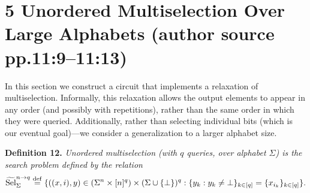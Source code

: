 \documentclass[10pt,a4paper]{article}
\newcommand{\uSel}{\widetilde{\operatorname{Sel}}}
\newenvironment{originalresult}[1]{\par\medskip\noindent\textbf{#1.}\itshape}{\par\medskip}
\begin{document}
\section*{5 Unordered Multiselection Over Large Alphabets (author source pp.11:9--11:13)}
In this section we construct a circuit that implements a relaxation of multiselection. Informally, this relaxation allows the output elements to appear in any order (and possibly with repetitions), rather than the same order in which they were queried. Additionally, rather than selecting individual bits (which is our eventual goal)---we consider a generalization to a larger alphabet size.
\begin{originalresult}{Definition 12}
Unordered multiselection (with $q$ queries, over alphabet $\Sigma$) is the search problem defined by the relation
\[\uSel_\Sigma^{n\to q}\stackrel{\rm def}=\{((x,i),y)\in(\Sigma^n\times[n]^q)\times(\Sigma\cup\{\bot\})^q:\{y_k:y_k\ne\bot\}_{k\in[q]}=\{x_{i_k}\}_{k\in[q]}\}.\]
\end{originalresult}
\end{document}
